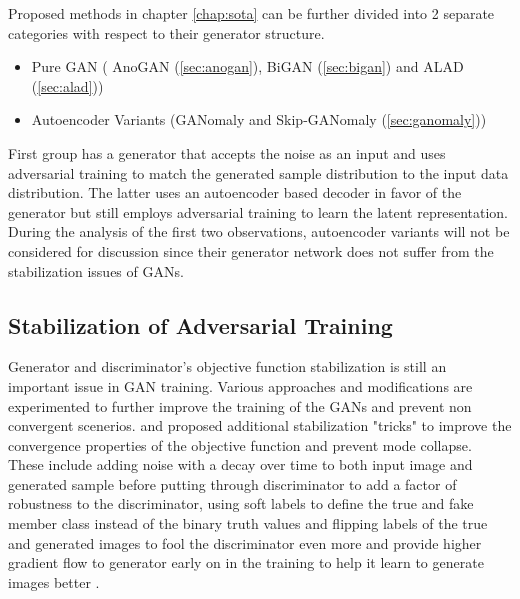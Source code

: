 Proposed methods in chapter \ref{chap:sota} can be further divided into 2 separate categories with
respect to their generator structure. 
\begin{itemize}
	\item Pure GAN ( AnoGAN (\ref{sec:anogan}), BiGAN (\ref{sec:bigan}) and ALAD (\ref{sec:alad}))
	\item Autoencoder Variants (GANomaly and Skip-GANomaly (\ref{sec:ganomaly}))
\end{itemize}

First group has a generator that accepts the noise as an input and uses adversarial training to
match the generated sample distribution to the input data distribution. The latter uses an
autoencoder based decoder in favor of the generator but still employs adversarial training to learn
the latent representation. During the analysis of the first two observations, autoencoder variants
will not be considered for discussion since their generator network does not suffer from the
stabilization issues of GANs.

\subsection{Stabilization of Adversarial Training}

Generator and discriminator's objective function stabilization is still an important issue in GAN
training. Various approaches and modifications are experimented to further improve the training of
the GANs and prevent non convergent scenerios. \cite{methods} and \cite{fm} proposed additional
stabilization "tricks" to improve the convergence properties of the objective function and prevent
mode collapse. These include adding noise with a decay over time to both input image and generated
sample before putting through discriminator to add a factor of robustness to the discriminator,
using soft labels to define the true and fake member class instead of the binary truth values and
flipping labels of the true and generated images to fool the discriminator even more and provide
higher gradient flow to generator early on in the training to help it learn to generate images
better \cite{fm}.


